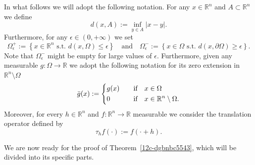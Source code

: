 \documentclass[12pt]{article}
\newcommand{\R}{\mathbb{R}}
\numberwithin{equation}{section}
\renewcommand{\leq}{\leqslant}
\renewcommand{\geq}{\geqslant}
\begin{document}
In what follows we will adopt the following notation. For any $x\in\R^n$ and $A\subset\R^n$ we define 
\begin{equation*}
d(x,A):=\inf_{y\in A}\left|x-y\right|.
\end{equation*} 
Furthermore, for any $\epsilon\in (0,+\infty)$  we set
\begin{equation}\label{setsepsilon}
\Omega_{\epsilon}^{+}:=\left\lbrace x\in\R^n\mbox{  s.t.  } d(x,\Omega)\leq \epsilon \right\rbrace\quad\mbox{and}\quad\Omega_{\epsilon}^{-}:=\left\lbrace x\in \Omega\mbox{  s.t.  }d(x,\partial \Omega)\geq \epsilon \right\rbrace.
\end{equation}
Note that $\Omega_{\epsilon}^{-}$ might be empty for large values of $\epsilon$. Furthermore, given any measurable $g:\Omega\to \R$ we adopt the following notation for its zero extension in $\R^n\setminus \Omega$
\begin{equation*}
\bar{g}(x):=\begin{dcases}
g(x)\quad &\mbox{if}\quad x\in\Omega\\
0\quad &\mbox{if}\quad x\in \R^n\setminus \Omega.
\end{dcases}
\end{equation*}
Moreover, for every  $h\in\R^n$ and $f:\R^n\to \R$ measurable we consider the translation operator defined by 
\begin{equation*}
\tau_h f(\cdot):=f(\cdot+h).
\end{equation*}

We are now ready for the proof of Theorem~\ref{12c-dgbnbc5543}, which will be divided into
its specific parts.
\end{document}
